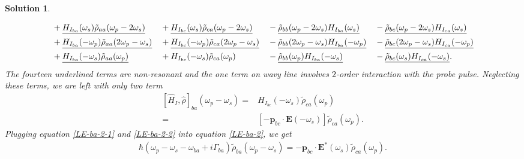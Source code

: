 \documentclass[UTF8,10pt,a4paper]{article}
\theoremstyle{Problem}
\theoremstyle{Solution}
\newtheorem*{sol}{Solution}
\begin{document}
\begin{sol}
\begin{enumerate}
\begin{align}
            \nonumber&+\uline{H_{I_{ba}}(\omega_s)\tilde{\rho}_{aa}(\omega_p-2\omega_s)}&&+\uline{H_{I_{bc}}(\omega_s)\tilde{\rho}_{ca}(\omega_p-2\omega_s)}&&-\uline{\tilde{\rho}_{bb}(\omega_p-2\omega_s)H_{I_{ba}}(\omega_s)}&&-\uline{\tilde{\rho}_{bc}(\omega_p-2\omega_s)H_{I_{ca}}(\omega_s)}\\
            \nonumber&+\uline{H_{I_{ba}}(-\omega_p)\tilde{\rho}_{aa}(2\omega_p-\omega_s)}&&+\uline{H_{I_{bc}}(-\omega_p)\tilde{\rho}_{ca}(2\omega_p-\omega_s)}&&-\uline{\tilde{\rho}_{bb}(2\omega_p-\omega_s)H_{I_{ba}}(-\omega_p)}&&-\uline{\tilde{\rho}_{bc}(2\omega_p-\omega_s)H_{I_{ca}}(-\omega_p)}\\
            &+\uline{H_{I_{ba}}(-\omega_s)\tilde{\rho}_{aa}(\omega_p)}&&+H_{I_{bc}}(-\omega_s)\tilde{\rho}_{ca}(\omega_p)&&-\uline{\tilde{\rho}_{bb}(\omega_p)H_{I_{ba}}(-\omega_s)}&&-\uline{\tilde{\rho}_{bc}(\omega_s)H_{I_{ca}}(-\omega_s)}.
        \end{align}
        The fourteen underlined terms are non-resonant and the one term on wavy line involves $2$-order interaction with the probe pulse. Neglecting these terms, we are left with only two term
        \begin{align}
            \label{LE-ba-2-2}
            \nonumber[\hat{H}_I,\hat{\rho}]_{ba}(\omega_p-\omega_s)=&H_{I_{bc}}(-\omega_s)\tilde{\rho}_{ca}(\omega_p)\\
            =&[-\bm{p}_{bc}\cdot\bm{E}(-\omega_s)]\tilde{\rho}_{ca}(\omega_p).
        \end{align}
        Plugging equation \eqref{LE-ba-2-1} and \eqref{LE-ba-2-2} into equation \eqref{LE-ba-2}, we get
        \begin{align}
            \label{LE-ba-3}
            \boxed{\hbar(\omega_p-\omega_s-\omega_{ba}+i\Gamma_{ba})\tilde{\rho}_{ba}(\omega_p-\omega_s)=-\bm{p}_{bc}\cdot\bm{E}^*(\omega_s)\tilde{\rho}_{ca}(\omega_p).}
        \end{align}

\end{enumerate}
\end{sol}
\end{document}
